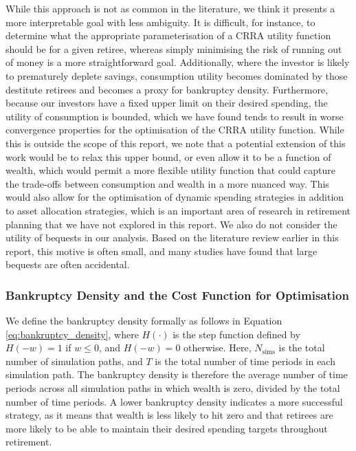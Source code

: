 \documentclass[11pt]{article}
\begin{document}
While this approach is not as common in the literature, we think it presents a more interpretable goal with less ambiguity. It is difficult, for instance, to determine what the appropriate parameterisation of a CRRA utility function should be for a given retiree, whereas simply minimising the risk of running out of money is a more straightforward goal. Additionally, where the investor is likely to prematurely deplete savings, consumption utility becomes dominated by those destitute retirees and becomes a proxy for bankruptcy density. Furthermore, because our investors have a fixed upper limit on their desired spending, the utility of consumption is bounded, which we have found tends to result in worse convergence properties for the optimisation of the CRRA utility function. While this is outside the scope of this report, we note that a potential extension of this work would be to relax this upper bound, or even allow it to be a function of wealth, which would permit a more flexible utility function that could capture the trade-offs between consumption and wealth in a more nuanced way. This would also allow for the optimisation of dynamic spending strategies in addition to asset allocation strategies, which is an important area of research in retirement planning that we have not explored in this report. We also do not consider the utility of bequests in our analysis. Based on the literature review earlier in this report, this motive is often small, and many studies have found that large bequests are often accidental.


\subsubsection{Bankruptcy Density and the Cost Function for Optimisation}

We define the bankruptcy density formally as follows in Equation \ref{eq:bankruptcy_density}, where \(H(\cdot)\) is the step function defined by \(H(-w)=1\) if \(w\leq 0\), and \(H(-w)=0\) otherwise. Here, \(N_{\mathrm{sims}}\) is the total number of simulation paths, and \(T\) is the total number of time periods in each simulation path. The bankruptcy density is therefore the average number of time periods across all simulation paths in which wealth is zero, divided by the total number of time periods. A lower bankruptcy density indicates a more successful strategy, as it means that wealth is less likely to hit zero and that retirees are more likely to be able to maintain their desired spending targets throughout retirement.
\end{document}
